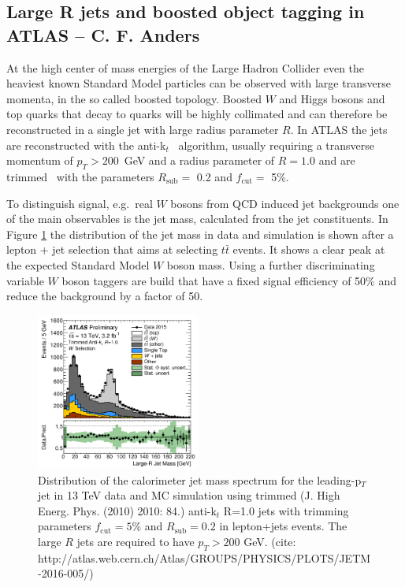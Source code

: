 \label{WG3}

\subsection{Large R jets and boosted object tagging in ATLAS -- C. F. Anders}
At the high center of mass energies of the Large Hadron Collider even the heaviest known Standard Model particles can be observed with large transverse momenta, in the so called boosted topology. Boosted $W$ and Higgs bosons and top quarks that decay to quarks will be highly collimated and can therefore be reconstructed in a single jet with large radius parameter $R$. In ATLAS the jets are reconstructed with the anti-k$_t$~\cite{Cacciari:2008gp} algorithm, usually requiring a transverse momentum of $p_T>200$~GeV and a radius parameter of $R=1.0$ and are trimmed~\cite{Krohn:2009th} with the parameters  $R_{\mathrm{sub}}=$ 0.2 and $f_{\mathrm{cut}}=$ 5\%. 

To distinguish signal, e.g.\ real $W$ bosons from QCD induced jet backgrounds one of the main observables is the jet mass, calculated from the jet constituents. In Figure \ref{fig:jetmass_W} the distribution of the jet mass in data and simulation is shown after a lepton + jet selection that aims at selecting $t\bar{t}$ events. It shows a clear peak at the expected Standard Model $W$ boson mass. Using a further discriminating variable $W$ boson taggers are build that have a fixed signal efficiency of 50\% and reduce the background by a factor of 50.
\begin{figure}[!h]
\begin{centering}
\includegraphics[width=0.48\textwidth]{WG3_plots/fig_07}
\caption{Distribution of the calorimeter jet mass spectrum for the leading-p$_T$ jet in 13 TeV data and MC simulation using trimmed (J. High Energ. Phys. (2010) 2010: 84.) anti-k$_t$ R=1.0 jets  with trimming parameters $f_{\mathrm{cut}}=5$\% and $R_{\mathrm{sub}} = 0.2$ in lepton+jets events. The large $R$ jets are required to have $p_T>200$ GeV. (cite: http://atlas.web.cern.ch/Atlas/GROUPS/PHYSICS/PLOTS/JETM-2016-005/)}
\label{fig:jetmass_W}
\end{centering}
\end{figure}


